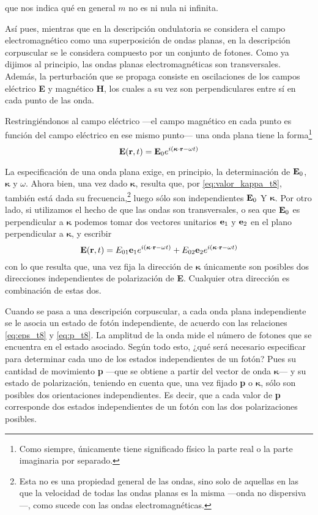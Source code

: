 que nos indica qué en general $m$ no es ni nula ni infinita.

Así pues, mientras que en la descripción ondulatoria se considera el campo electromagnético como una superposición de ondas planas, en la descripción corpuscular se le considera compuesto por un conjunto de fotones.
Como ya dijimos al principio, las ondas planas electromagnéticas son transversales.
Además, la perturbación que se propaga consiste en oscilaciones de los campos eléctrico \textbf{E} y magnético \textbf{H}, los cuales a su vez son perpendiculares entre sí en cada punto de las onda.

Restringiéndonos al campo eléctrico ---el campo magnético en cada punto es función del campo eléctrico en ese mismo punto--- una onda plana tiene la forma\footnote{Como siempre, únicamente tiene significado físico la parte real o la parte imaginaria por separado.}
\begin{equation}
	\vb{E}(\vb{r}, t) = \vb{E}_0 e^{i(\bm{\kappa}\cdot\vb{r}-\omega t)}
\end{equation}

La especificación de una onda plana exige, en principio, la determinación de $\vb{E}_0$, $\bm{\kappa}$ y $\omega$.
Ahora bien, una vez dado $\bm{\kappa}$, resulta que, por \eqref{eq:valor_kappa_t8}, también está dada su frecuencia,\footnote{ Esta no es una propiedad general de las ondas, sino solo de aquellas en las que la velocidad de todas las ondas planas es la misma ---onda no dispersiva---, como sucede con las ondas electromagnéticas.} luego sólo son independientes $\vb{E}_0$ Y $\bm{\kappa}$.
Por otro lado, si utilizamos el hecho de que las ondas son transversales, o sea que $\vb{E}_0$ es perpendicular a $\bm{\kappa}$ podemos tomar dos vectores unitarios $\vb{e}_1$ y $\vb{e}_2$ en el plano perpendicular a $\bm{\kappa}$, y escribir
\begin{equation}\label{eq:E_1_t8}
	\vb{E}(\vb{r}, t) = E_{01} \vb{e}_1 e^{i(\bm{\kappa}\cdot\vb{r}-\omega t)} + E_{02} \vb{e}_2 e^{i(\bm{\kappa}\cdot\vb{r}-\omega t)}
\end{equation}
con lo que resulta que, una vez fija la dirección de $\bm{\kappa}$ únicamente son posibles dos direcciones independientes de polarización de \textbf{E}. Cualquier otra dirección es combinación de estas dos.

Cuando se pasa a una descripción corpuscular, a cada onda plana independiente se le asocia un estado de fotón independiente, de acuerdo con las relaciones \eqref{eq:eps_t8} y \eqref{eq:p_t8}.
La amplitud de la onda mide el número de fotones que se encuentra en el estado asociado.
Según todo esto, ¿qué será necesario especificar para determinar cada uno de los estados independientes de un fotón?
Pues su cantidad de movimiento \textbf{p} ---que se obtiene a partir del vector de onda $\bm{\kappa}$--- y su estado de polarización, teniendo en cuenta que, una vez fijado \textbf{p} o $\bm{\kappa}$, sólo son posibles dos orientaciones independientes.
Es decir, que a cada valor de \textbf{p} corresponde dos estados independientes de un fotón con las dos polarizaciones posibles.

